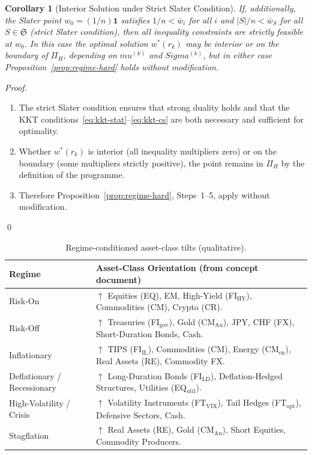 \documentclass[12pt,openany]{book}
\newcommand{\bfw}{\mathbf{w}}
\newcommand{\bfmu}{\boldsymbol{\mu}}
\newcommand{\bfSigma}{\boldsymbol{\Sigma}}
\newcommand{\bfone}{\mathbf{1}}
\numberwithin{equation}{chapter}
\theoremstyle{plain}
\newtheorem{corollary}[theorem]{Corollary}
\theoremstyle{definition}
\theoremstyle{remark}
\def\mathcal#1{#1}%
\def\bfw{w}%
\def\bfmu{mu}%
\def\bfSigma{Sigma}%
\begin{document}
\begin{corollary}[Interior Solution under Strict Slater Condition]
\label{cor:interior}
If, additionally, the Slater point $\bfw_0 = (1/n)\bfone$
satisfies $1/n < \bar{w}_i$ for all $i$ and
$|\mathcal{S}|/n < \bar{w}_{\mathcal{S}}$ for all $\mathcal{S} \in \mathfrak{S}$
(strict Slater condition), then all inequality constraints are
strictly feasible at $\bfw_0$.  In this case the optimal
solution $\bfw^{*}(r_k)$ may be interior or on the boundary
of $\Pi_H$, depending on $\bfmu^{(k)}$ and $\bfSigma^{(k)}$,
but in either case Proposition~\ref{prop:regime-hard} holds
without modification.
\end{corollary}

\begin{proof}
\begin{enumerate}
  \item The strict Slater condition ensures that strong duality
        holds and that the KKT conditions~\eqref{eq:kkt-stat}--\eqref{eq:kkt-cs}
        are both necessary and sufficient for optimality.

  \item Whether $\bfw^{*}(r_k)$ is interior (all inequality
        multipliers zero) or on the boundary (some multipliers
        strictly positive), the point remains in $\Pi_H$ by the
        definition of the programme.

  \item Therefore Proposition~\ref{prop:regime-hard},
        Steps~1--5, apply without modification.
\end{enumerate}
\qed
\end{proof}

\begin{table}[H]
\centering
\caption{Regime-conditioned asset-class tilts (qualitative).}
\label{tab:regime-tilts}
\begin{tabularx}{\textwidth}{@{} l X @{}}
\toprule
\textbf{Regime} & \textbf{Asset-Class Orientation (from concept document)} \\
\midrule
Risk-On &
  $\uparrow$ Equities (EQ), EM, High-Yield (FI$_{\mathrm{HY}}$),
  Commodities (CM), Crypto (CR). \\
\addlinespace
Risk-Off &
  $\uparrow$ Treasuries (FI$_{\mathrm{gov}}$), Gold (CM$_{\mathrm{Au}}$),
  JPY, CHF (FX), Short-Duration Bonds, Cash. \\
\addlinespace
Inflationary &
  $\uparrow$ TIPS (FI$_{\mathrm{IL}}$), Commodities (CM),
  Energy (CM$_{\mathrm{en}}$), Real Assets (RE), Commodity FX. \\
\addlinespace
Deflationary / Recessionary &
  $\uparrow$ Long-Duration Bonds (FI$_{\mathrm{LD}}$),
  Deflation-Hedged Structures, Utilities (EQ$_{\mathrm{util}}$). \\
\addlinespace
High-Volatility / Crisis &
  $\uparrow$ Volatility Instruments (FT$_{\mathrm{VIX}}$),
  Tail Hedges (FT$_{\mathrm{opt}}$), Defensive Sectors, Cash. \\
\addlinespace
Stagflation &
  $\uparrow$ Real Assets (RE), Gold (CM$_{\mathrm{Au}}$),
  Short Equities, Commodity Producers. \\
\bottomrule
\end{tabularx}
\end{table}
\end{document}
